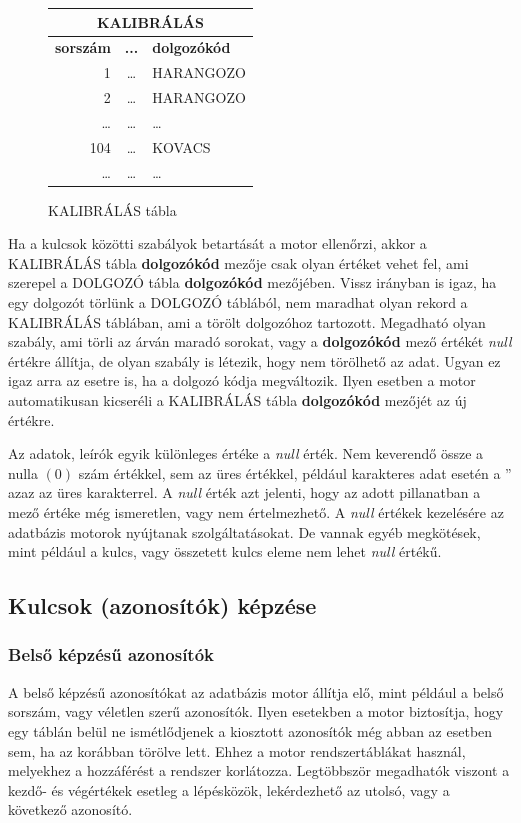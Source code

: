 \documentclass[a4paper,12pt]{report}
\begin{document}
\begin{figure}[ht!]\centering

\begin{tabular}{|r|c|l|}
        \hline
        \multicolumn{3}{|c|}{\textbf{KALIBRÁLÁS}}\\
        \hline
        \textbf{sorszám}&\textbf{...}&\textbf{dolgozókód}\\
        \hline
        1&\dots&HARANGOZO\\
        \hline
        2&\dots&HARANGOZO\\
        \hline
        \dots&\dots&\dots\\
        \hline
        104&\dots&KOVACS\\
        \hline
        \dots&\dots&\dots\\
\end{tabular}
\caption{KALIBRÁLÁS tábla}\label{kalib}
\end{figure}
        

Ha a kulcsok közötti szabályok betartását a motor ellenőrzi, akkor a KALIBRÁLÁS 
tábla \textbf{dolgozókód} mezője csak olyan értéket vehet fel, ami szerepel a 
DOLGOZÓ tábla \textbf{dolgozókód} mezőjében. Vissz irányban is igaz, ha egy 
dolgozót törlünk a DOLGOZÓ táblából, nem maradhat olyan rekord a KALIBRÁLÁS 
táblában, ami a törölt dolgozóhoz tartozott. Megadható olyan szabály, ami törli 
az árván maradó sorokat, vagy a \textbf{dolgozókód} mező értékét \textit{null} 
értékre állítja, de olyan szabály is létezik, hogy nem törölhető az adat.
Ugyan ez igaz arra az esetre is, ha a dolgozó kódja megváltozik. Ilyen esetben 
a motor automatikusan kicseréli a KALIBRÁLÁS tábla \textbf{dolgozókód} mezőjét 
az új értékre.

Az adatok, leírók egyik különleges értéke a \textit{null} érték. Nem keverendő
össze a nulla $(0)$ szám értékkel, sem az üres értékkel, például karakteres
adat esetén a '' azaz az üres karakterrel. A \textit{null} érték azt jelenti, 
hogy az adott pillanatban a mező értéke még ismeretlen, vagy nem értelmezhető.
A \textit{null} értékek kezelésére az adatbázis motorok nyújtanak 
szolgáltatásokat. De vannak egyéb megkötések, mint például a kulcs, vagy 
összetett kulcs eleme nem lehet \textit{null} értékű.

\subsection{Kulcsok (azonosítók) képzése}

\subsubsection{Belső képzésű azonosítók}
A belső képzésű azonosítókat az adatbázis motor állítja elő, mint például a 
belső sorszám, vagy véletlen szerű azonosítók. Ilyen esetekben a motor 
biztosítja, hogy egy táblán belül ne ismétlődjenek a kiosztott azonosítók még 
abban az esetben sem, ha az korábban törölve lett. Ehhez a motor 
rendszertáblákat használ, melyekhez a hozzáférést a rendszer korlátozza. 
Legtöbbször megadhatók viszont a kezdő- és végértékek esetleg a lépésközök, 
lekérdezhető az utolsó, vagy a következő azonosító.
\end{document}
